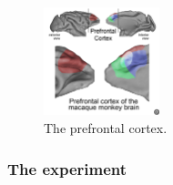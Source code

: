 \documentclass[11pt]{book} %
\begin{document}
\begin{figure}[h]
    \centering
    \includegraphics[width=0.3\textwidth]{./Figs/PFC2.png}
    \caption{The prefrontal cortex.}
\end{figure}


\subsubsection{The experiment}
\end{document}
